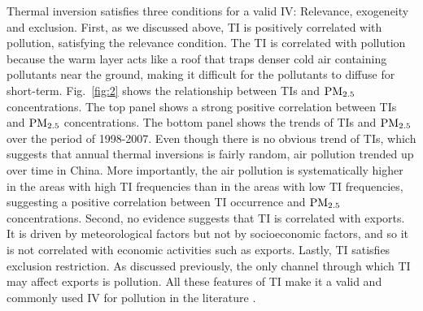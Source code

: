 \documentclass[12pt]{article}
\begin{document}
  Thermal inversion satisfies three conditions for a valid IV: Relevance, exogeneity and exclusion. First, as we discussed above, TI is
  positively correlated with pollution, satisfying the relevance
  condition. The TI is correlated with pollution because the warm layer acts like a roof that traps
  denser cold air containing pollutants near the ground, making it difficult for the pollutants
  to diffuse for short-term. Fig.~\ref{fig:2} shows the relationship between
  TIs and $\rm PM_{2.5}$ concentrations. The top panel shows a strong
  positive correlation between TIs and $\rm PM_{2.5}$ concentrations. The bottom panel shows the trends of TIs and $\rm PM_{2.5}$ over the period of 1998-2007. Even though there is no obvious
  trend of TIs, which suggests that annual thermal inversions is fairly random, air
  pollution trended up over time in China. More importantly, the air pollution is systematically higher in the areas with high TI frequencies than in the areas with low TI frequencies, suggesting a positive correlation between TI occurrence and $\rm PM_{2.5}$ concentrations. Second, no evidence suggests that TI is correlated with exports. It is driven by meteorological factors but not by socioeconomic factors, and so it is not correlated with economic activities such as exports. Lastly, TI satisfies exclusion restriction. As discussed previously, the only channel through which TI may affect exports is pollution. All these features of TI make it a valid and commonly used IV for pollution in the literature \citep{arceo2016does,jans2018economic,sager2019estimating,chen2022effect,khanna2021productivity}.  
\end{document}
